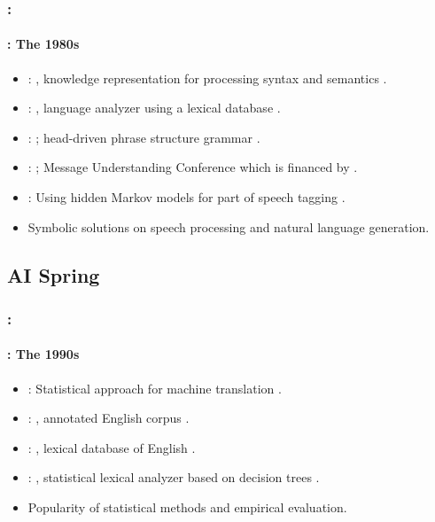 \documentclass[xcolor=table]{beamer}
\begin{document}
\begin{frame}
	\frametitle{\insertshortsubtitle: \insertsection}
	\framesubtitle{\insertsubsection: The 1980s}

	\begin{itemize}
		\item {}: , knowledge representation for processing syntax and semantics \cite{1980-bobrow}.
		\item {}: , language analyzer using a lexical database \cite{1986-jacobs}.
		\item {}: ; head-driven phrase structure grammar \cite{1987-sag-pollard}.
		\item {}: ; Message Understanding Conference which is financed by .
		\item {}: Using hidden Markov models for part of speech tagging \cite{1988-church}.
		\item Symbolic solutions on speech processing and natural language generation.
	\end{itemize}

\end{frame}

\subsection{AI Spring}

\begin{frame}
	\frametitle{\insertshortsubtitle: \insertsection}
	\framesubtitle{\insertsubsection: The 1990s}

	\begin{itemize}
		\item {}: Statistical approach for machine translation \cite{1990-brown-al}.
		\item {}: , annotated English corpus \cite{1993-marcus-al}.
		\item {}: , lexical database of English \cite{1995-miller}.
		\item {}: , statistical lexical analyzer based on decision trees \cite{1996-magerman}.
		\item Popularity of statistical methods and empirical evaluation.
	\end{itemize}

\end{frame}
\end{document}
